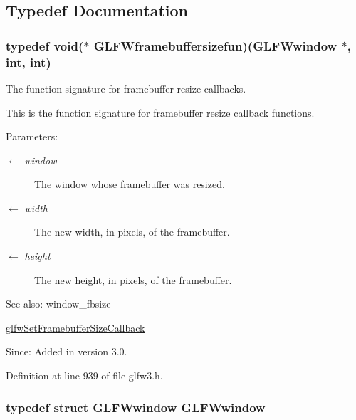 \subsection{Typedef Documentation}
\hypertarget{group__window_g311bb32e578aa240b6464af494debffc}{
\subsubsection[GLFWframebuffersizefun]{\setlength{\rightskip}{0pt plus 5cm}typedef void($\ast$  {\bf GLFWframebuffersizefun})({\bf GLFWwindow} $\ast$, int, int)}}
\label{group__window_g311bb32e578aa240b6464af494debffc}


The function signature for framebuffer resize callbacks. 

This is the function signature for framebuffer resize callback functions.

\begin{Desc}
\item[Parameters:]
\begin{description}
\item[\mbox{$\leftarrow$} {\em window}]The window whose framebuffer was resized. \item[\mbox{$\leftarrow$} {\em width}]The new width, in pixels, of the framebuffer. \item[\mbox{$\leftarrow$} {\em height}]The new height, in pixels, of the framebuffer.\end{description}
\end{Desc}
\begin{Desc}
\item[See also:]window\_\-fbsize 

\hyperlink{group__window_gd766bcdb4465f9c6c62e5d8ca7cfba56}{glfwSetFramebufferSizeCallback}\end{Desc}
\begin{Desc}
\item[Since:]Added in version 3.0. \end{Desc}


Definition at line 939 of file glfw3.h.\hypertarget{group__window_g3c96d80d363e67d13a41b5d1821f3242}{
\subsubsection[GLFWwindow]{\setlength{\rightskip}{0pt plus 5cm}typedef struct {\bf GLFWwindow} {\bf GLFWwindow}}}
\label{group__window_g3c96d80d363e67d13a41b5d1821f3242}


